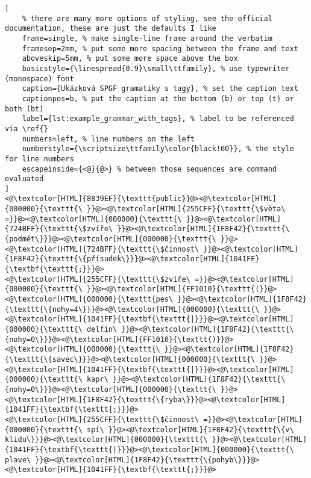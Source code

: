 \begin{lstlisting}[
	% there are many more options of styling, see the official documentation, these are just the defaults I like
	frame=single, % make single-line frame around the verbatim
	framesep=2mm, % put some more spacing between the frame and text
	aboveskip=5mm, % put some more space above the box
	basicstyle={\linespread{0.9}\small\ttfamily}, % use typewriter (monospace) font
	caption={Ukázková SPGF gramatiky s tagy}, % set the caption text
	captionpos=b, % put the caption at the bottom (b) or top (t) or both (bt)
	label={lst:example_grammar_with_tags}, % label to be referenced via \ref{}
	numbers=left, % line numbers on the left
	numberstyle={\scriptsize\ttfamily\color{black!60}}, % the style for line numbers
	escapeinside={<@}{@>} % between those sequences are command evaluated
]
<@\textcolor[HTML]{8839EF}{\texttt{public}}@><@\textcolor[HTML]{000000}{\texttt{\ }}@><@\textcolor[HTML]{255CFF}{\texttt{\$věta\ =}}@><@\textcolor[HTML]{000000}{\texttt{\ }}@><@\textcolor[HTML]{724BFF}{\texttt{\$zvíře\ }}@><@\textcolor[HTML]{1F8F42}{\texttt{\{podmět\}}}@><@\textcolor[HTML]{000000}{\texttt{\ }}@><@\textcolor[HTML]{724BFF}{\texttt{\$činnost\ }}@><@\textcolor[HTML]{1F8F42}{\texttt{\{přísudek\}}}@><@\textcolor[HTML]{1041FF}{\textbf{\texttt{;}}}@>
<@\textcolor[HTML]{255CFF}{\texttt{\$zvíře\ =}}@><@\textcolor[HTML]{000000}{\texttt{\ }}@><@\textcolor[HTML]{FF1010}{\texttt{(}}@><@\textcolor[HTML]{000000}{\texttt{pes\ }}@><@\textcolor[HTML]{1F8F42}{\texttt{\{nohy=4\}}}@><@\textcolor[HTML]{000000}{\texttt{\ }}@><@\textcolor[HTML]{1041FF}{\textbf{\texttt{|}}}@><@\textcolor[HTML]{000000}{\texttt{\ delfín\ }}@><@\textcolor[HTML]{1F8F42}{\texttt{\{nohy=0\}}}@><@\textcolor[HTML]{FF1010}{\texttt{)}}@><@\textcolor[HTML]{000000}{\texttt{\ }}@><@\textcolor[HTML]{1F8F42}{\texttt{\{savec\}}}@><@\textcolor[HTML]{000000}{\texttt{\ }}@><@\textcolor[HTML]{1041FF}{\textbf{\texttt{|}}}@><@\textcolor[HTML]{000000}{\texttt{\ kapr\ }}@><@\textcolor[HTML]{1F8F42}{\texttt{\{nohy=0\}}}@><@\textcolor[HTML]{000000}{\texttt{\ }}@><@\textcolor[HTML]{1F8F42}{\texttt{\{ryba\}}}@><@\textcolor[HTML]{1041FF}{\textbf{\texttt{;}}}@>
<@\textcolor[HTML]{255CFF}{\texttt{\$činnost\ =}}@><@\textcolor[HTML]{000000}{\texttt{\ spí\ }}@><@\textcolor[HTML]{1F8F42}{\texttt{\{v\ klidu\}}}@><@\textcolor[HTML]{000000}{\texttt{\ }}@><@\textcolor[HTML]{1041FF}{\textbf{\texttt{|}}}@><@\textcolor[HTML]{000000}{\texttt{\ plave\ }}@><@\textcolor[HTML]{1F8F42}{\texttt{\{pohyb\}}}@><@\textcolor[HTML]{1041FF}{\textbf{\texttt{;}}}@>
\end{lstlisting}
